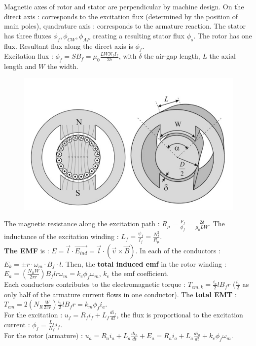 \documentclass[../main.tex]{subfiles}
\begin{document}
Magnetic axes of rotor and stator are perpendicular by machine design. On the direct axis : corresponds to the excitation flux (determined by the position of main poles), quadrature axis : corresponds to the armature reaction. The stator has three fluxes $\phi_f, \phi_{CW}, \phi_{AP}$ creating a resulting stator flux $\phi_s$. The rotor has one flux. Resultant flux along the direct axis is $\phi_f$.\\

Excitation flux : $\phi_f = SB_f = \mu_0 \frac{LW N_fI_f}{2\delta}$, with $\delta$ the air-gap length, $L$ the axial length and $W$ the width. 
\begin{figure}[hbt!]
    \centering
    \includegraphics[width=0.5\linewidth]{IMAGES/Indus_el/Screenshot from 2025-03-03 16-23-35.png}
\end{figure}

The magnetic resistance along the excitation path : $R_\mu = \frac{F_f}{\phi_f} = \frac{2\delta}{\mu_0 LW}$. The inductance of the excitation winding : $L_f = \frac{\psi_f}{I_f} = \frac{N_f^2}{R_\mu}$.\\

\textbf{The EMF} is : $E = \vec{l} \cdot \vec{E_{ind}} = \vec{l} \cdot (\vec{v} \times \vec{B})$. In each of the conductors : $E_k = \pm r\cdot \omega_m \cdot B_f \cdot l$. Then, the \textbf{total induced emf} in the rotor winding : $E_a = (\frac{N_RW}{2\pi r}) B_f l r \omega_m = k_e \phi_f \omega_m$, $k_e$ the emf coefficient.\\

Each conductors contributes to the electromagnetic torque : $T_{em,k} = \frac{i_a}{2} l B_f r$ ($\frac{i_a}{2}$ as only half of the armature current flows in one conductor). The \textbf{total EMT} : $T_{em} = 2(N_R \frac{W}{2\pi r}) \frac{i_a}{2} l B_f r = k_m \phi_f i_a$. \\

For the excitation : $u_f = R_fi_f + L_f \frac{di_f}{dt}$, the flux is proportional to the excitation current : $\phi_f = \frac{L_f}{N_f} i_f$.\\
For the rotor (armature) : $u_a = R_ai_a + L_a \frac{di_a}{dt} + E_a = R_ai_a + L_a \frac{di_a}{dt} + k_e \phi_f \omega_m$.\\
\end{document}
